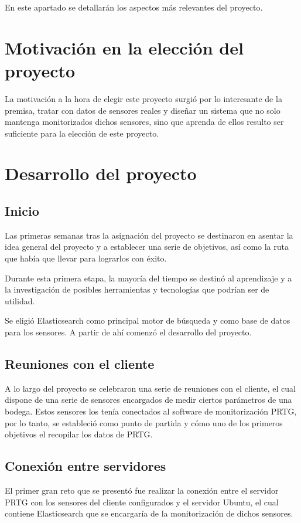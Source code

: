 

En este apartado se detallarán los aspectos más relevantes del proyecto.

\section{Motivación en la elección del proyecto}

La motivación a la hora de elegir este proyecto surgió por lo interesante de la premisa, tratar con datos de sensores reales y diseñar un sistema que no solo mantenga monitorizados dichos sensores, sino que aprenda de ellos resulto ser suficiente para la elección de este proyecto. 

\section{Desarrollo del proyecto}

\subsection{Inicio}

Las primeras semanas tras la asignación del proyecto se destinaron en asentar la idea general del proyecto y a establecer una serie de objetivos, así como la ruta que había que llevar para lograrlos con éxito.

Durante esta primera etapa, la mayoría del tiempo se destinó al aprendizaje y a la investigación de posibles herramientas y tecnologías que podrían ser de utilidad.

Se eligió Elasticsearch como principal motor de búsqueda y como base de datos para los sensores. A partir de ahí comenzó el desarrollo del proyecto.

\subsection{Reuniones con el cliente}

A lo largo del proyecto se celebraron una serie de reuniones con el cliente, el cual dispone de una serie de sensores encargados de medir ciertos parámetros de una bodega. Estos sensores los tenía conectados al software de monitorización PRTG, por lo tanto, se estableció como punto de partida y cómo uno de los primeros objetivos el recopilar los datos de PRTG. 

\subsection{Conexión entre servidores}
El primer gran reto que se presentó fue realizar la conexión entre el servidor PRTG con los sensores del cliente configurados y el servidor Ubuntu, el cual contiene Elasticsearch que se encargaría de la monitorización de dichos sensores. 

